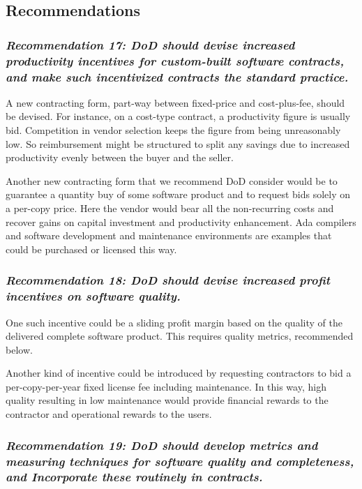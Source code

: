 \documentclass[12pt]{article}
\begin{document}
\subsection*{Recommendations}

\subsubsection*{\textit{Recommendation 17: DoD should devise increased productivity incentives
for custom-built software contracts, and make such incentivized contracts the
standard practice.}}

A new contracting form, part-way between fixed-price and cost-plus-fee, should
be devised. For instance, on a cost-type contract, a productivity figure is
usually bid.  Competition in vendor selection keeps the figure from being
unreasonably low. So reimbursement might be structured to split any savings due
to increased productivity evenly between the buyer and the seller.

Another new contracting form that we recommend DoD consider would be to
guarantee a quantity buy of some software product and to request bids solely on
a per-copy price. Here the vendor would bear all the non-recurring costs and
recover gains on capital investment and productivity enhancement. Ada compilers
and software development and maintenance environments are examples that could
be purchased or licensed this way.

\subsubsection*{\textit{Recommendation 18: DoD should devise increased profit incentives on
software quality.}}

One such incentive could be a sliding profit margin based on the quality of the
delivered complete software product. This requires quality metrics, recommended
below.

Another kind of incentive could be introduced by requesting contractors to bid
a per-copy-per-year fixed license fee including maintenance. In this way, high
quality resulting in low maintenance would provide financial rewards to the
contractor and operational rewards to the users.

\subsubsection*{\textit{Recommendation 19: DoD should develop metrics and
measuring techniques for software quality and completeness, and Incorporate
these routinely in contracts.}}
\end{document}
